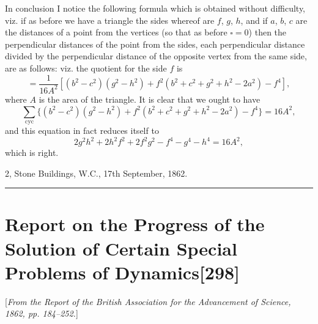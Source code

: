 \documentclass[11pt,a4paper]{article}
\newcommand{\paper}[2]{\section[#1]{#1\hfill\textnormal{[#2]}}}
\begin{document}
In conclusion I notice the following formula which is obtained without difficulty, viz. if as before we have a triangle the sides whereof are $f$, $g$, $h$, and if $a$, $b$, $c$ are the distances of a point from the vertices (so that as before $\square = 0$) then the perpendicular distances of the point from the sides, each perpendicular distance divided by the perpendicular distance of the opposite vertex from the same side, are as follows: viz. the quotient for the side $f$ is
\[
= \frac{1}{16A^2}[(b^2-c^2)(g^2-h^2) + f^2(b^2+c^2+g^2+h^2-2a^2) - f^4],
\]
where $A$ is the area of the triangle. It is clear that we ought to have
\[
\sum_{\mathrm{cyc}}\{(b^2-c^2)(g^2-h^2) + f^2(b^2+c^2+g^2+h^2-2a^2) - f^4\} = 16A^2,
\]
and this equation in fact reduces itself to
\[
2g^2h^2 + 2h^2f^2 + 2f^2g^2 - f^4 - g^4 - h^4 = 16A^2,
\]
which is right.

\begin{flushright}
2, Stone Buildings, W.C., 17th September, 1862.
\end{flushright}

\vspace{1.5em}
\hrule
\vspace{1.5em}

\paper{Report on the Progress of the Solution of Certain Special Problems of Dynamics}{298}

{\small
[\textit{From the Report of the British Association for the Advancement of Science, 1862, pp. 184--252.}]
\par}
\vspace{0.5em}

\setcounter{page}{513}
\end{document}
